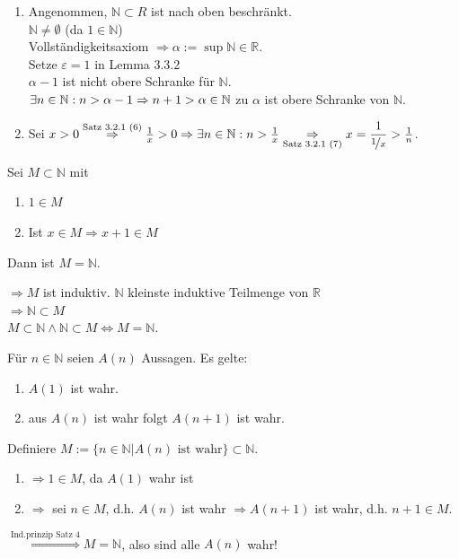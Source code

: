 \documentclass[../ana1.tex]{subfiles}
\begin{document}
\begin{bew}
	\begin{enumerate}
		\item Angenommen, $\mathbb{N}\subset{R}$ ist nach oben beschränkt.\\
		      $\mathbb{N} \neq \emptyset$ (da $1\in\mathbb{N}$)\\
		      Vollständigkeitsaxiom $\Rightarrow \alpha := \sup \mathbb{N} \in \mathbb{R}$.\\
		      Setze $\varepsilon = 1$ in Lemma 3.3.2\\ %
		      $\alpha -1$ ist nicht obere Schranke für $\mathbb{N}$.\\
		      $\exists n\in \mathbb{N}: n>\alpha-1\\
			      \Rightarrow n+1 > \alpha \in \mathbb{N}$ \Lightning  zu $\alpha$ ist obere Schranke von $\mathbb{N}$.
		\item Sei $x>0 \overset{\text{Satz 3.2.1 (6)}}{\Rightarrow} \frac{1}{x} > 0\Rightarrow \exists n\in \mathbb{N}: n > \frac{1}{x}\underset{\text{Satz 3.2.1 (7)}}{\Rightarrow} x = \dfrac{1}{\nicefrac{1}{x}} > \frac{1}{n}$. %
	\end{enumerate}
\end{bew}
\begin{satz}[Induktionsprinzip]
	Sei $M\subset \mathbb{N}$ mit
	\begin{enumerate}
		\item $1\in M$
		\item Ist $x\in M \Rightarrow x+1 \in M$
	\end{enumerate}
	Dann ist $M= \mathbb{N}$.
\end{satz}
\begin{bew}
	$\Rightarrow M$ ist induktiv. $\mathbb{N}$ kleinste induktive Teilmenge von $\mathbb{R}$\\
	$\Rightarrow \mathbb{N} \subset M$\\
	$M\subset \mathbb{N} \wedge \mathbb{N} \subset M \Leftrightarrow M = \mathbb{N}$.
\end{bew}
\begin{kor}
	Für $n\in\mathbb{N}$ seien $A(n)$ Aussagen.
	Es gelte:
	\begin{enumerate}
		\item $A(1)$ ist wahr.
		\item aus $A(n)$ ist wahr folgt $A(n+1)$ ist wahr.
	\end{enumerate}
\end{kor}
\begin{bew}
	Definiere $M := \{n\in \mathbb{N}| A(n) \text{ ist wahr}\} \subset \mathbb{N}$.
	\begin{enumerate}
		\item $\Rightarrow 1\in M$, da $A(1)$ wahr ist
		\item $\Rightarrow$ sei $n\in M$, d.h. $A(n)$ ist wahr $\Rightarrow A(n+1)$ ist wahr, d.h. $n+1\in M$.
	\end{enumerate}
	$\overset{\text{Ind.prinzip Satz 4}}{\Rightarrow} M = \mathbb{N}$, also sind alle $A(n)$ wahr! %
\end{bew}
\end{document}
